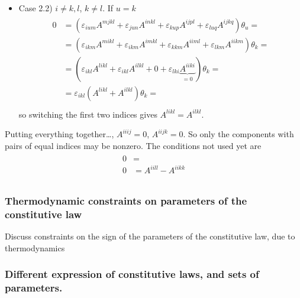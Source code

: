 \documentclass[letterpaper,10pt,english]{jupyterBook}
\begin{document}
\begin{itemize}
\begin{itemize}
\item {} 
\sphinxAtStartPar
Case 2.2) \(i \ne k, l\), \(k \ne l\). If \(u = k\)
\begin{equation*}
\begin{split}\begin{aligned}
       0 
       & = \left( \varepsilon_{ium} A^{mjkl} + \varepsilon_{jun} A^{inkl} + \varepsilon_{kup} A^{ijpl} + \varepsilon_{luq} A^{ijkq} \right) \theta_u = \\
       & = \left( \varepsilon_{ikm} A^{mikl} + \varepsilon_{ikm} A^{imkl} + \varepsilon_{kkm} A^{iiml} + \varepsilon_{lkm} A^{iikm} \right) \theta_k = \\
       & = \left( \varepsilon_{ikl} A^{likl} + \varepsilon_{ikl} A^{ilkl} + 0 + \varepsilon_{lki} \underbrace{ A^{iiki} }_{=0} \right) \theta_k = \\
       & = \varepsilon_{ikl} \left(  A^{likl} + A^{ilkl} \right) \theta_k = \\
     \end{aligned}\end{split}
\end{equation*}
\sphinxAtStartPar
so switching the first two indices gives \(A^{likl} = A^{ilkl}\).

\end{itemize}

\end{itemize}

\sphinxAtStartPar
Putting everything together…, \(A^{iiij} = 0\), \(A^{iijk} = 0\). So only the components with pairs of equal indices may be non\sphinxhyphen{}zero. The conditions not used yet are
\begin{equation*}
\begin{split}\begin{aligned}
 0 & =  \\
 0 & = A^{iill} - A^{iikk} \\
\end{aligned}\end{split}
\end{equation*}

\subsubsection*{Thermodynamic constraints on parameters of the constitutive law}

\sphinxAtStartPar
{} Discuss constraints on the sign of the parameters of the constitutive law, due to thermodynamics
\subsubsection*{Different expression of constitutive laws, and sets of parameters.}
\end{document}
